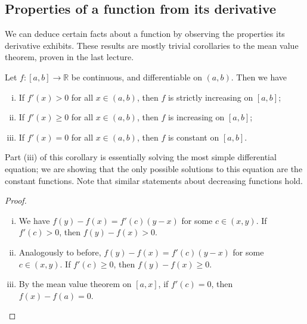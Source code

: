 \subsection{Properties of a function from its derivative}
We can deduce certain facts about a function by observing the properties its derivative exhibits.
These results are mostly trivial corollaries to the mean value theorem, proven in the last lecture.
\begin{corollary}
	Let \(f \colon [a,b] \to \mathbb R\) be continuous, and differentiable on \((a, b)\).
	Then we have
	\begin{enumerate}[(i)]
		\item If \(f'(x) > 0\) for all \(x \in (a, b)\), then \(f\) is strictly increasing on \([a, b]\);
		\item If \(f'(x) \geq 0\) for all \(x \in (a, b)\), then \(f\) is increasing on \([a, b]\);
		\item If \(f'(x) = 0\) for all \(x \in (a, b)\), then \(f\) is constant on \([a, b]\).
	\end{enumerate}
\end{corollary}
\noindent Part (iii) of this corollary is essentially solving the most simple differential equation; we are showing that the only possible solutions to this equation are the constant functions.
Note that similar statements about decreasing functions hold.
\begin{proof}
	\begin{enumerate}[(i)]
		\item We have \(f(y) - f(x) = f'(c)(y-x)\) for some \(c \in (x, y)\).
		      If \(f'(c) > 0\), then \(f(y) - f(x) > 0\).
		\item Analogously to before, \(f(y) - f(x) = f'(c)(y-x)\) for some \(c \in (x, y)\).
		      If \(f'(c) \geq 0\), then  \(f(y) - f(x) \geq 0\).
		\item By the mean value theorem on \([a, x]\), if \(f'(c) = 0\), then \(f(x) - f(a) = 0\).
	\end{enumerate}
\end{proof}

